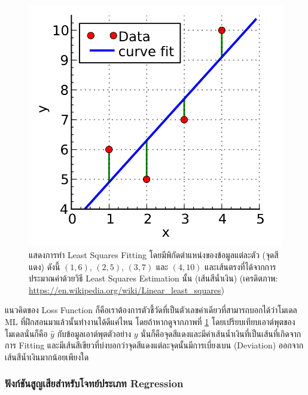 \begin{figure}[H]
    \centering
    \includegraphics[width=0.45\linewidth]{fig/least-squares-fitting.png}
    \caption{แสดงการทำ Least Squares Fitting โดยมีพิกัดตำแหน่งของข้อมูลแต่ละตัว (จุดสีแดง) ดังนี้ $(1,6)$, $(2,5)$, $(3,7)$ และ $(4,10)$ และเส้นตรงที่ได้จากการประมาณค่าด้วยวิธี Least Squares Estimation นั้น (เส้นสีน้ำเงิน) (เครดิตภาพ: \url{https://en.wikipedia.org/wiki/Linear_least_squares})}
    \label{fig:least_square_fitting}
\end{figure}

แนวคิดของ Loss Function ก็คือเราต้องการตัวชี้วัดที่เป็นตัวเลขค่าเดียวที่สามารถบอกได้ว่าโมเดล ML ที่ฝึกสอนมาแล้วนั้นทำงานได้ดีแค่ไหน
โดยถ้าหากดูจากภาพที่ \ref{fig:least_square_fitting} โดยเปรียบเทียบเอาต์พุตของโมเดลนั่นก็คือ $\hat{y}$ กับข้อมูลเอาต์พุตตัวอย่าง $y$ นั่นก็คือจุดสีแดงและมีค่าเส้นน้ำเงินที่เป็นเส้นที่เกิดจากการ Fitting และมีเส้นสีเขียวที่บ่งบอกว่าจุดสีแดงแต่ละจุดนั้นมีการเบี่ยงเบน (Deviation) ออกจากเส้นสีน้ำเงินมากน้อยเพียงใด

\subsubsection{ฟังก์ชันสูญเสียสำหรับโจทย์ประเภท Regression}
\label{sssec:loss_func_reg}


